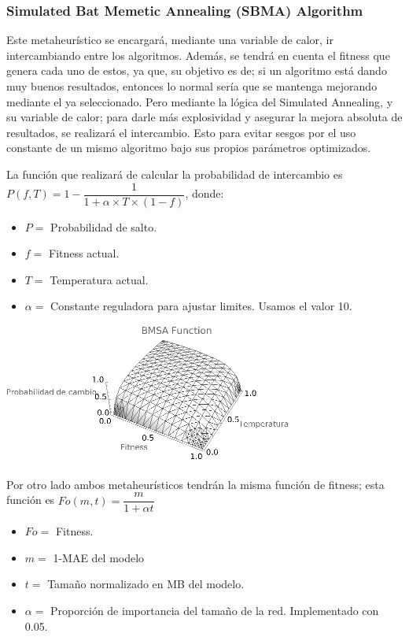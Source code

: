 \subsubsection{Simulated Bat Memetic Annealing (SBMA) Algorithm}
Este metaheurístico se encargará, mediante una variable de calor, ir intercambiando entre los algoritmos. Además, se tendrá en cuenta el fitness que genera cada uno de estos, ya que, su objetivo es de; si un algoritmo está dando muy buenos resultados, entonces lo normal sería que se mantenga mejorando mediante el ya seleccionado. Pero mediante la lógica del Simulated Annealing, y su variable de calor; para darle más explosividad y asegurar la mejora absoluta de resultados, se realizará el intercambio. Esto para evitar sesgos por el uso constante de un mismo algoritmo bajo sus propios parámetros optimizados.\newline

La función que realizará de calcular la probabilidad de intercambio es
$P(f,T) = 1 - \dfrac{1}{1+\alpha\times T\times(1-f)}$, donde:

\begin{itemize}
    \item $P =$ Probabilidad de salto.
    \item $f =$ Fitness actual.
    \item $T =$ Temperatura actual.
    \item $\alpha =$ Constante reguladora para ajustar limites. Usamos el valor 10.
\end{itemize}

\begin{center}
    \includegraphics[scale=0.4]{Imagenes/BMSA.png}
\end{center}

Por otro lado ambos metaheurísticos tendrán la misma función de fitness; esta función es $Fo(m,t)=\dfrac{m}{1+\alpha t}$

\begin{itemize}
    \item $Fo =$ Fitness.
    \item $m =$ 1-MAE del modelo
    \item $t =$ Tamaño normalizado en MB del modelo.
    \item $\alpha =$  Proporción de importancia del tamaño de la red. Implementado con 0.05.
\end{itemize}

